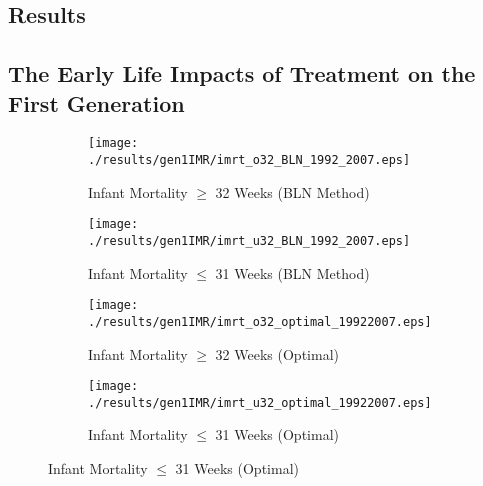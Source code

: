 \documentclass[11pt]{article}
\begin{document}
\begin{spacing}{1.5}
  \clearpage
  \section{Results}
  \subsection{The Early Life Impacts of Treatment on the First Generation}
  \begin{figure}[htpb!]
    \caption{Birthweight Assignment Thresholds and Infant Mortality}
    \label{fig:IMR}
    \begin{subfigure}{.49\textwidth}
      \centering
      \texttt{[image: ./results/gen1IMR/imrt\_o32\_BLN\_1992\_2007.eps]}
      \caption{Infant Mortality $\geq$ 32 Weeks (BLN Method)}
      \label{fig:IMRBLN32}
    \end{subfigure}
    \begin{subfigure}{.49\textwidth}
      \centering
      \texttt{[image: ./results/gen1IMR/imrt\_u32\_BLN\_1992\_2007.eps]}
      \caption{Infant Mortality $\leq$ 31 Weeks (BLN Method)}
      \label{fig:IMRBLN31}
    \end{subfigure}

    \begin{subfigure}{.49\textwidth}
      \centering
      \texttt{[image: ./results/gen1IMR/imrt\_o32\_optimal\_19922007.eps]}
      \caption{Infant Mortality $\geq$ 32 Weeks (Optimal)}
      \label{fig:IMROPT32}
    \end{subfigure}
    \begin{subfigure}{.49\textwidth}
      \centering
      \texttt{[image: ./results/gen1IMR/imrt\_u32\_optimal\_19922007.eps]}
      \caption{Infant Mortality $\leq$ 31 Weeks (Optimal)}
      \label{fig:IMROPT31}
    \end{subfigure}


\end{figure}
\end{spacing}
\end{document}
